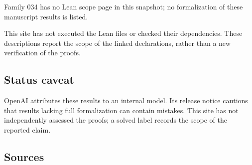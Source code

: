 \documentclass[11pt]{article}
\begin{document}
Family 034 has no Lean scope page in this snapshot; no formalization of these manuscript results is listed.

This site has not executed the Lean files or checked their dependencies. These descriptions report the scope of the linked declarations, rather than a new verification of the proofs.

\subsection{Status caveat}
OpenAI attributes these results to an internal model. Its release notice cautions that results lacking full formalization can contain mistakes. This site has not independently assessed the proofs; a solved label records the scope of the reported claim.

\subsection{Sources}
\end{document}
